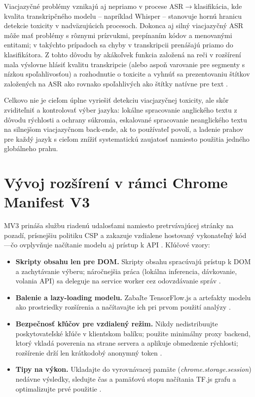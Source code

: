 Viacjazyčné problémy vznikajú aj nepriamo v procese ASR$\rightarrow$klasifikácia, kde kvalita transkripčného modelu – napríklad Whisper – stanovuje hornú hranicu detekcie toxicity v nadväzujúcich procesoch. Dokonca aj silný viacjazyčný ASR môže mať problémy s rôznymi prízvukmi, prepínaním kódov a menovanými entitami; v takýchto prípadoch sa chyby v transkripcii prenášajú priamo do klasifikátora. Z tohto dôvodu by akákoľvek funkcia založená na reči v rozšírení mala výslovne hlásiť kvalitu transkripcie (alebo aspoň varovanie pre segmenty s nízkou spoľahlivosťou) a rozhodnutie o toxicite a vyhnúť sa prezentovaniu štítkov založených na ASR ako rovnako spoľahlivých ako štítky natívne pre text \cite{sikiandani2025browser}\cite{radford2022whisper}.

Celkovo nie je cieľom úplne vyriešiť detekciu viacjazyčnej toxicity, ale skôr zviditeľniť a kontrolovať výber jazyka: lokálne spracovanie anglického textu z dôvodu rýchlosti a ochrany súkromia, eskalované spracovanie neanglického textu na silnejšom viacjazyčnom back-ende, ak to používateľ povolí, a ladenie prahov pre každý jazyk s cieľom znížiť systematickú zaujatosť namiesto použitia jedného globálneho prahu.

\section{Vývoj rozšírení v rámci Chrome Manifest V3}
MV3 prináša službu riadenú udalosťami namiesto pretrvávajúcej stránky na pozadí, prísnejšiu politiku CSP a zakazuje vzdialene hostovaný vykonateľný kód---čo ovplyvňuje načítanie modelu aj prístup k API \cite{chromemv3}\cite{chromeCSP}\cite{chromeServiceWorkers}. Kľúčové vzory:
\begin{itemize}
  \item \textbf{Skripty obsahu len pre DOM.} Skripty obsahu spracúvajú prístup k DOM a zachytávanie výberu; náročnejšia práca (lokálna inferencia, dávkovanie, volania API) sa deleguje na service worker cez odovzdávanie správ \cite{chromemv3}\cite{chromeContentScripts}
  \cite{chromeMessaging}.
  \item \textbf{Balenie a lazy-loading modelu.} Zabaľte TensorFlow.js a artefakty modelu ako prostriedky rozšírenia a načítavajte ich pri prvom použití analýzy \cite{tfjsToxicity}\cite{chromemv3}\cite{chromeCSP}.
  \item \textbf{Bezpečnosť kľúčov pre vzdialený režim.} Nikdy nedistribuujte poskytovateľské kľúče v klientskom balíku; použite minimálny proxy backend, ktorý vkladá poverenia na strane servera a aplikuje obmedzenie rýchlosti; rozšírenie drží len krátkodobý anonymný token \cite{chromemv3}\cite{chromeCSP}.
  \item \textbf{Tipy na výkon.} Ukladajte do vyrovnávacej pamäte (\emph{chrome.storage.session}) nedávne výsledky, sledujte čas a pamäťovú stopu načítania TF.js grafu a optimalizujte prvé použitie \cite{tfjsToxicity}\cite{chromemv3}.
\end{itemize}

